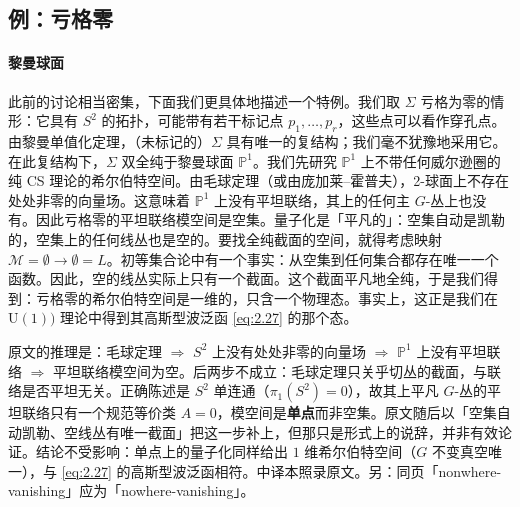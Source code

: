 \subsection{例：亏格零}\label{sec:4.3}

\paragraph{黎曼球面}
此前的讨论相当密集，下面我们更具体地描述一个特例。我们取 $\Sigma$ 亏格为零的情形：它具有 $S^2$ 的拓扑，可能带有若干标记点 $p_1,\dots,p_r$，这些点可以看作穿孔点。
由黎曼单值化定理，（未标记的）$\Sigma$ 具有唯一的复结构；我们毫不犹豫地采用它。在此复结构下，$\Sigma$ 双全纯于黎曼球面 $\mathbb{P}^1$。我们先研究 $\mathbb{P}^1$ 上不带任何威尔逊圈的纯 CS 理论的希尔伯特空间。由毛球定理（或由庞加莱–霍普夫），2-球面上不存在处处非零的向量场。这意味着 $\mathbb{P}^1$ 上没有平坦联络，其上的任何主 $G$-丛上也没有。因此亏格零的平坦联络模空间是空集。量子化是「平凡的」：空集自动是凯勒的，空集上的任何线丛也是空的。要找全纯截面的空间，就得考虑映射 $\mathcal{M}=\emptyset\longrightarrow\emptyset=L$。初等集合论中有一个事实：从空集到任何集合都存在唯一一个函数。因此，空的线丛实际上只有一个截面。这个截面平凡地全纯，于是我们得到：亏格零的希尔伯特空间是一维的，只含一个物理态。事实上，这正是我们在 $\mathrm{U}(1))$ 理论中得到其高斯型波泛函 \eqref{eq:2.27} 的那个态。

\begin{yizhu}[原文疑误]
原文的推理是：毛球定理 $\Rightarrow$ $S^2$ 上没有处处非零的向量场 $\Rightarrow$ $\mathbb{P}^1$ 上没有平坦联络 $\Rightarrow$ 平坦联络模空间为空。后两步不成立：毛球定理只关乎切丛的截面，与联络是否平坦无关。正确陈述是 $S^2$ 单连通（$\pi_1(S^2)=0$），故其上平凡 $G$-丛的平坦联络只有一个规范等价类 $A=0$，模空间是\textbf{单点}而非空集。原文随后以「空集自动凯勒、空线丛有唯一截面」把这一步补上，但那只是形式上的说辞，并非有效论证。结论不受影响：单点上的量子化同样给出 $1$ 维希尔伯特空间（$G$ 不变真空唯一），与 \eqref{eq:2.27} 的高斯型波泛函相符。中译本照录原文。另：同页「nonwhere-vanishing」应为「nowhere-vanishing」。
\end{yizhu}

